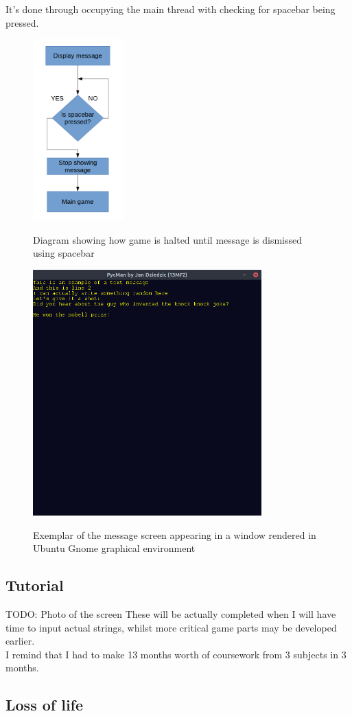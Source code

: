 \documentclass[11pt,a4paper]{report}
\newcommand{\dsubsection}[1]{\FloatBarrier \subsection{#1}}
\newenvironment{img}{
	\begin{center}
		\begin{figure}[H]
			\begin{center}
			
}{
	\end{center}
		\end{figure}
			\end{center}
}
\begin{document}
			It's done through occupying the main thread with checking for spacebar being pressed.
			\begin{img}
				\includegraphics[width=100pt]{images/message-dismiss}\\
				\caption{Diagram showing how game is halted until message is dismissed using spacebar}
			\end{img}
			\begin{img}
				\includegraphics[width=250pt]{images/message-example-joke}\\
				\caption{Exemplar of the message screen appearing in a window rendered in Ubuntu Gnome graphical environment}
			\end{img}
			\dsubsection{Tutorial}
				TODO: Photo of the screen These will be actually completed when I will have time to input actual strings, whilst more critical game parts may be developed earlier.\\
				I remind that I had to make 13 months worth of coursework from 3 subjects in 3 months.
			\dsubsection{Loss of life}
\end{document}

